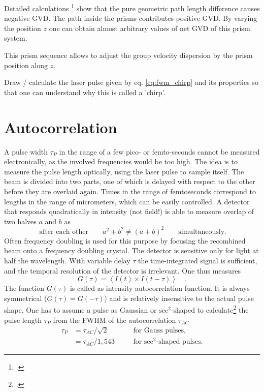  Detailed calculations \footcite{DielsRudolph1996}
show that the pure geometric path length difference causes 
negative GVD. The path inside the prisms contributes  positive GVD.  By varying the position $z$ one can obtain almost arbitrary values of net GVD of this prism system.


\begin{marginfigure}
\caption{This prism sequence allows to adjust the group velocity dispersion by the prism position along $z$. }
\label{fig_pulses_prism}
\end{marginfigure}


\begin{questions}
\item Draw / calculate the laser pulse  given by eq. \ref{eq:fwm_chirp} and its properties so that one can understand why this is called a 'chirp'.
\end{questions}



\section{Autocorrelation}

A pulse width $\tau_P$ in the range of a few pico- or femto-seconds cannot be measured electronically, as the involved frequencies  would be too high. The idea is to measure the pulse length optically, using the  laser pulse to sample itself. The beam is divided into two parts, one of which is delayed with respect to the other before they are overlaid again.
 Times in the 
range of femtoseconds correspond to lengths in the range of
micrometers, which can be easily controlled. A detector that responds quadratically in intensity (not field!) is able to measure  overlap of two halves $a$ and $b$ as
\begin{equation}
 \ \text{after each other} \qquad a^2 + b^2 \neq (a+b)^2 \qquad
 \text{simultaneously.}
\end{equation}
Often  frequency doubling is used for this purpose by focusing the
recombined beam onto a frequency doubling crystal.
The detector is sensitive only for light at half the wavelength. With variable delay $\tau$ the time-integrated signal is sufficient, and  the temporal resolution
of the detector is  irrelevant. One thus measures
\begin{equation}
  G(\tau) = \left< I(t) \times I(t-\tau) \right> \quad.
\end{equation}
The function $G(\tau)$ is called as intensity autocorrelation function. It is always symmetrical ($G(\tau) = G(-\tau)$) and
is relatively insensitive to the actual pulse shape.  One has to assume a pulse as Gaussian
 or
$\text{sec}^2$-shaped to calculate\footcite{DielsRudolph1996} the pulse length $\tau_{P} $ from the 
FWHM of the autocorrelation
$\tau_{AC}$ 
\begin{align}
  \tau_{P} &= \tau_{AC} / \sqrt{2} &\quad& \text{for Gauss pulses,} \\
           &= \tau_{AC} / 1,543 && \text{for $\text{sec}^2$-shaped pulses.}
\end{align}


